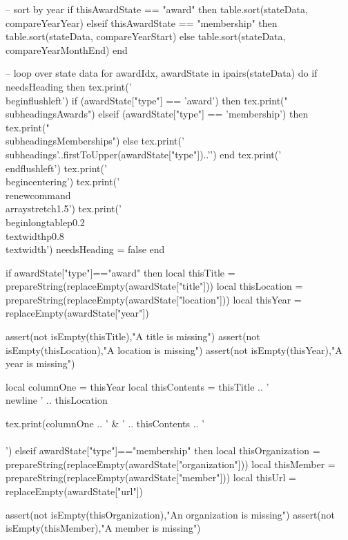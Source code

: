 \documentclass[letterpaper, 10pt]{article}
\newcommand{\subheadings}[1]{\textbf{#1} \vspace{5pt}}
\begin{document}
\begin{luacode}
			-- sort by year
			if thisAwardState == "award" then
				table.sort(stateData, compareYearYear)
			elseif thisAwardState == "membership" then
				table.sort(stateData, compareYearStart)
			else
				table.sort(stateData, compareYearMonthEnd)
			end

			-- loop over state data
			for awardIdx, awardState in ipairs(stateData) do
				if needsHeading then
					tex.print('\\begin{flushleft}')
					if (awardState["type"] == 'award') then
						tex.print("\\subheadings{Awards}")
					elseif (awardState["type"] == 'membership') then
						tex.print("\\subheadings{Memberships}")
					else
						tex.print('\\subheadings{'..firstToUpper(awardState["type"])..'}')
					end
					tex.print('\\end{flushleft}')
					tex.print('\\begin{centering}')
					tex.print('\\renewcommand{\\arraystretch}{1.5}')
					tex.print('\\begin{longtable}{p{0.2\\textwidth}p{0.8\\textwidth}}')
					needsHeading = false
				end

				if awardState["type"]=="award" then
					local thisTitle    	= prepareString(replaceEmpty(awardState["title"]))
					local thisLocation  = prepareString(replaceEmpty(awardState["location"]))
					local thisYear   	= replaceEmpty(awardState["year"])

					assert(not isEmpty(thisTitle),"A title is missing")
					assert(not isEmpty(thisLocation),"A location is missing")
					assert(not isEmpty(thisYear),"A year is missing")

					local columnOne = thisYear
					local thisContents = thisTitle ..
										'\\newline ' .. thisLocation

					tex.print(columnOne .. ' & ' .. thisContents .. ' \\\\')
				elseif awardState["type"]=="membership" then
					local thisOrganization 	= prepareString(replaceEmpty(awardState["organization"]))
					local thisMember   		= prepareString(replaceEmpty(awardState["member"]))
					local thisUrl 			= replaceEmpty(awardState["url"])

					assert(not isEmpty(thisOrganization),"An organization is missing")
					assert(not isEmpty(thisMember),"A member is missing")


\end{luacode}
\end{document}
